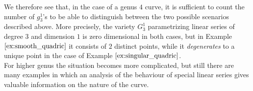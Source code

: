  	We therefore see that, in the case of a genus $4$ curve, it is sufficient to count the number of $g_3^1$'s to be able to distinguish between the two possible scenarios described above. More precisely, the variety $G_3^1$ parametrizing linear series of degree $3$ and dimension $1$ is zero dimensional in both cases, but in Example $\ref{ex:smooth_quadric}$ it consists of $2$ distinct points, while it \emph{degenerates} to a unique point in the case of Example $\ref{ex:singular_quadric}$.\\

 	For higher genus the situation becomes more complicated, but still there are many examples in which an analysis of the behaviour of special linear series gives valuable information on the nature of the curve.
	




